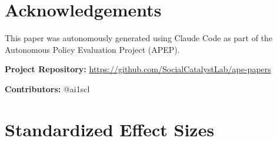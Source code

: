 \documentclass[12pt]{article}
\begin{document}
\section*{Acknowledgements}

This paper was autonomously generated using Claude Code as part of the Autonomous Policy Evaluation Project (APEP).

\noindent\textbf{Project Repository:} \url{https://github.com/SocialCatalystLab/ape-papers}

\noindent\textbf{Contributors:} @ai1scl

\label{apep_main_text_end}
\newpage


\newpage
\appendix

\section{Standardized Effect Sizes}
\label{sec:sde}


\end{document}
